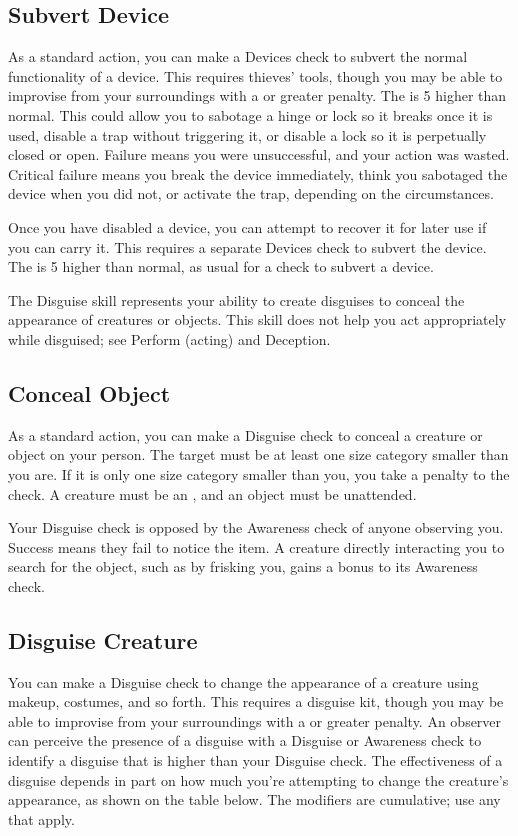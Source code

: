     \subsection{Subvert Device}
        As a standard action, you can make a Devices check to subvert the normal functionality of a device.
        This requires thieves' tools, though you may be able to improvise from your surroundings with a  or greater penalty.
        The  is 5 higher than normal. This could allow you to sabotage a hinge or lock so it breaks once it is used, disable a trap without triggering it, or disable a lock so it is perpetually closed or open. Failure means you were unsuccessful, and your action was wasted. Critical failure means you break the device immediately, think you sabotaged the device when you did not, or activate the trap, depending on the circumstances.

        Once you have disabled a device, you can attempt to recover it for later use if you can carry it. This requires a separate Devices check to subvert the device. The  is 5 higher than normal, as usual for a check to subvert a device.

\newpage
{}
    The Disguise skill represents your ability to create disguises to conceal the appearance of creatures or objects.
    This skill does not help you act appropriately while disguised; see Perform (acting) and Deception.

    \subsection{Conceal Object}
        As a standard action, you can make a Disguise check to conceal a creature or object on your person.
        The target must be at least one size category smaller than you are.
        If it is only one size category smaller than you, you take a  penalty to the check.
        A creature must be an , and an object must be unattended.

        Your Disguise check is opposed by the Awareness check of anyone observing you.
        Success means they fail to notice the item. A creature directly interacting you to search for the object, such as by frisking you, gains a  bonus to its Awareness check.

    \subsection{Disguise Creature}\label{Disguise Creature}
        You can make a Disguise check to change the appearance of a creature using makeup, costumes, and so forth.
        This requires a disguise kit, though you may be able to improvise from your surroundings with a  or greater penalty.
        An observer can perceive the presence of a disguise with a Disguise or Awareness check to identify a disguise that is higher than your Disguise check. The effectiveness of a disguise depends in part on how much you're attempting to change the creature's appearance, as shown on the table below. The modifiers are cumulative; use any that apply.

